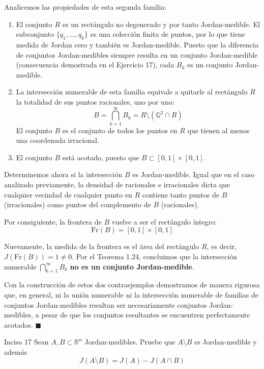\documentclass[11pt,letterpaper]{article}
\begin{document}
Analicemos las propiedades de esta segunda familia:
\begin{enumerate}
    \item El conjunto $R$ es un rectángulo no degenerado y por tanto Jordan-medible. El subconjunto $\{q_1, \dots, q_k\}$ es una colección finita de puntos, por lo que tiene medida de Jordan cero y también es Jordan-medible. Puesto que la diferencia de conjuntos Jordan-medibles siempre resulta en un conjunto Jordan-medible (consecuencia demostrada en el Ejercicio 17), cada $B_k$ es un conjunto Jordan-medible.
    \item La intersección numerable de esta familia equivale a quitarle al rectángulo $R$ la totalidad de sus puntos racionales, uno por uno:
    \begin{equation*}
    B = \bigcap_{k=1}^{\infty} B_k = R \setminus (\mathbb{Q}^2 \cap R)
    \end{equation*}
    El conjunto $B$ es el conjunto de todos los puntos en $R$ que tienen al menos una coordenada irracional.
    \item El conjunto $B$ está acotado, puesto que $B \subset [0,1] \times [0,1]$.
\end{enumerate}

Determinemos ahora si la intersección $B$ es Jordan-medible. Igual que en el caso analizado previamente, la densidad de racionales e irracionales dicta que cualquier vecindad de cualquier punto en $R$ contiene tanto puntos de $B$ (irracionales) como puntos del complemento de $B$ (racionales).

Por consiguiente, la frontera de $B$ vuelve a ser el rectángulo íntegro:
\begin{equation*}
\text{Fr}(B) = [0,1] \times [0,1]
\end{equation*}

Nuevamente, la medida de la frontera es el área del rectángulo $R$, es decir, $J(\text{Fr}(B)) = 1 \neq 0$. Por el Teorema 1.24, concluimos que la intersección numerable $\bigcap_{k=1}^{\infty} B_k$ \textbf{no es un conjunto Jordan-medible}.

\vspace{0.5cm}
Con la construcción de estos dos contraejemplos demostramos de manera rigurosa que, en general, ni la unión numerable ni la intersección numerable de familias de conjuntos Jordan-medibles resultan ser necesariamente conjuntos Jordan-medibles, a pesar de que los conjuntos resultantes se encuentren perfectamente acotados. \hfill $\blacksquare$

\begin{inciso}{Inciso 17}
Sean $A, B\subset\mathbb{R}^{n}$ Jordan-medibles. Pruebe que $A\setminus B$ es Jordan-medible y además
\begin{equation*}
    J(A\setminus B)=J(A)-J(A\cap B)
\end{equation*}
\end{inciso}
\end{document}
